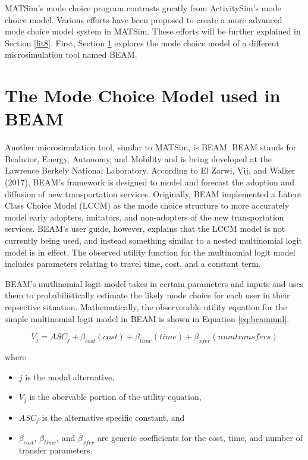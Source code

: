 \documentclass[12pt, oneside, openright]{byuthesis}
\providecommand{\tightlist}{%
  \setlength{\itemsep}{0pt}\setlength{\parskip}{0pt}}
\begin{document}
MATSim's mode choice program contrasts greatly from ActivitySim's mode choice model. Various efforts have been proposed to create a more advanced mode choice model system in MATSim. These efforts will be further explained in Section \ref{lit8}. First, Section \ref{lit7} explores the mode choice model of a different microsimulation tool named BEAM.

\hypertarget{lit7}{%
\section{The Mode Choice Model used in BEAM}\label{lit7}}

Another microsimulation tool, similar to MATSim, is BEAM. BEAM stands for Beahvior, Energy, Autonomy, and Mobility and is being developed at the Lawrence Berkely National Laboratory. According to El Zarwi, Vij, and Walker (2017), BEAM's framework is designed to model and forecast the adoption and diffusion of new transportation services. Originally, BEAM implemented a Latent Class Choice Model (LCCM) as the mode choice structure to more accurately model early adopters, imitators, and non-adopters of the new transportation services. BEAM's user guide, however, explains that the LCCM model is not currently being used, and instead something similar to a nested multinomial logit model is in effect. The observed utility function for the multinomial logit model includes parameters relating to travel time, cost, and a constant term.

BEAM's mutlinomial logit model takes in certain parameters and inputs and uses them to probabilistically estimate the likely mode choice for each user in their repsective situation. Mathematically, the observerable utility equation for the simple multinomial logit model in BEAM is shown in Equation \eqref{eq:beammnl}.

\begin{equation}
  V_j = ASC_j + \beta_{cost}(cost) + \beta_{time}(time) + \beta_{xfer}(numtransfers) 
    \label{eq:beammnl}
\end{equation}

where

\begin{itemize}
\tightlist
\item
  \(j\) is the modal alternative,
\item
  \(V_j\) is the obervable portion of the utility equation,
\item
  \(ASC_j\) is the alternative specific constant, and
\item
  \(\beta_{cost}\), \(\beta_{time}\), and \(\beta_{xfer}\) are generic coefficients for the cost, time, and number of transfer parameters.
\end{itemize}
\end{document}
